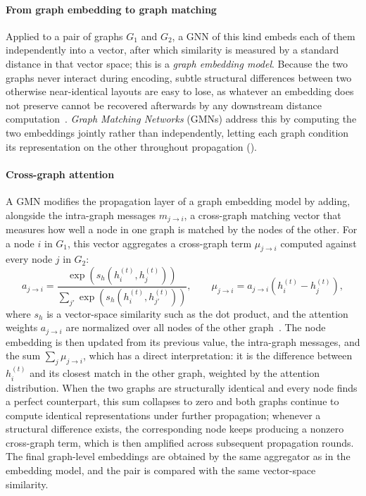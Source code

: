 \paragraph{From graph embedding to graph matching}
Applied to a pair of graphs $G_1$ and $G_2$, a GNN of this kind embeds each of them independently into a vector, after which similarity is measured by a standard distance in that vector space; this is a \emph{graph embedding model}. Because the two graphs never interact during encoding, subtle structural differences between two otherwise near-identical layouts are easy to lose, as whatever an embedding does not preserve cannot be recovered afterwards by any downstream distance computation~\cite{li-gmn-2019}. \emph{Graph Matching Networks} (GMNs) address this by computing the two embeddings jointly rather than independently, letting each graph condition its representation on the other throughout propagation (). 

\paragraph{Cross-graph attention}
A GMN modifies the propagation layer of a graph embedding model by adding, alongside the intra-graph messages $m_{j\to i}$, a cross-graph matching vector that measures how well a node in one graph is matched by the nodes of the other. For a node $i$ in $G_1$, this vector aggregates a cross-graph term $\mu_{j\to i}$ computed against every node $j$ in $G_2$:
\[
a_{j\to i} = \frac{\exp\!\left(s_h\!\left(h_i^{(t)}, h_j^{(t)}\right)\right)}{\sum_{j'} \exp\!\left(s_h\!\left(h_i^{(t)}, h_{j'}^{(t)}\right)\right)}, \qquad
\mu_{j\to i} = a_{j\to i}\left(h_i^{(t)} - h_j^{(t)}\right),
\]
where $s_h$ is a vector-space similarity such as the dot product, and the attention weights $a_{j\to i}$ are normalized over all nodes of the other graph~\cite{li-gmn-2019}. The node embedding is then updated from its previous value, the intra-graph messages, and the sum $\sum_j \mu_{j\to i}$, which has a direct interpretation: it is the difference between $h_i^{(t)}$ and its closest match in the other graph, weighted by the attention distribution. When the two graphs are structurally identical and every node finds a perfect counterpart, this sum collapses to zero and both graphs continue to compute identical representations under further propagation; whenever a structural difference exists, the corresponding node keeps producing a nonzero cross-graph term, which is then amplified across subsequent propagation rounds. The final graph-level embeddings are obtained by the same aggregator as in the embedding model, and the pair is compared with the same vector-space similarity.

